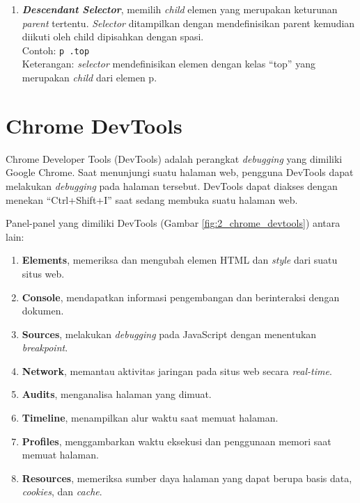 \begin{enumerate}
	\item \textit{\textbf{Descendant Selector}}, memilih \textit{child} elemen yang merupakan keturunan \textit{parent} tertentu. \textit{Selector} ditampilkan dengan mendefinisikan parent kemudian diikuti oleh child dipisahkan dengan spasi.\\
			Contoh: \texttt{p .top}\\
			Keterangan: \textit{selector} mendefinisikan elemen dengan kelas ``top'' yang merupakan \textit{child} dari elemen p. 
\end{enumerate}		

\section{Chrome DevTools}
\label{sec:devtools}

Chrome Developer Tools (DevTools) adalah perangkat \textit{debugging} yang dimiliki Google Chrome\cite{devtools}. Saat menunjungi suatu halaman web, pengguna DevTools dapat melakukan \textit{debugging} pada halaman tersebut. DevTools dapat diakses dengan menekan ``Ctrl+Shift+I'' saat sedang membuka suatu halaman web.  

Panel-panel yang dimiliki DevTools (Gambar \ref{fig:2_chrome_devtools}) antara lain:
\begin{enumerate}
	\item \textbf{Elements}, memeriksa dan mengubah elemen HTML dan \textit{style} dari suatu situs web.
	\item \textbf{Console}, mendapatkan informasi pengembangan dan berinteraksi dengan dokumen.
	\item \textbf{Sources}, melakukan \textit{debugging} pada JavaScript dengan menentukan \textit{breakpoint}.
	\item \textbf{Network}, memantau aktivitas jaringan pada situs web secara \textit{real-time}.
	\item \textbf{Audits}, menganalisa halaman yang dimuat.
	\item \textbf{Timeline}, menampilkan alur waktu saat memuat halaman.
	\item \textbf{Profiles}, menggambarkan waktu eksekusi dan penggunaan memori saat memuat halaman.
	\item \textbf{Resources}, memeriksa sumber daya halaman yang dapat berupa basis data, \textit{cookies}, dan \textit{cache}.
\end{enumerate}

